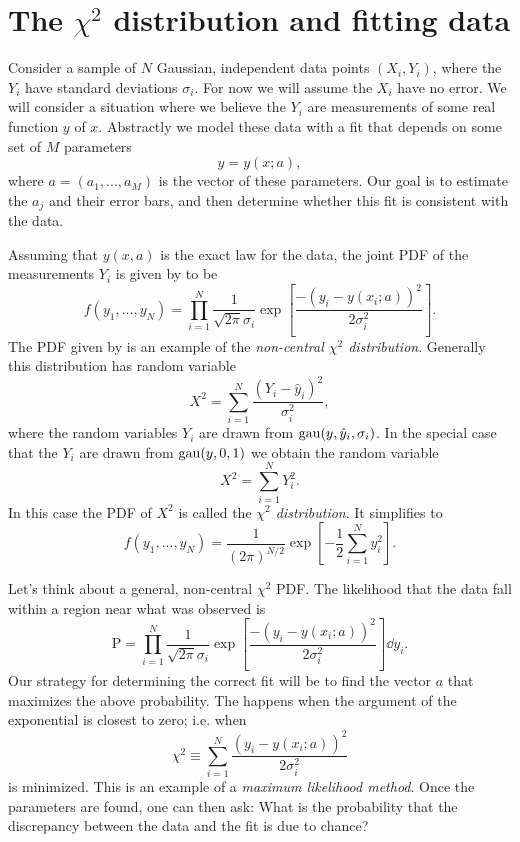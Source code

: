 \section{The $\chi^2$ distribution and fitting data}
Consider a sample of $N$ Gaussian, independent data points $(X_i,Y_i)$,
where the $Y_i$ have standard deviations $\sigma_i$. For now we will
assume the $X_i$ have no error. We will consider a situation where
we believe the $Y_i$ are measurements of some real function $y$ of $x$.
Abstractly we model these data with a fit that depends on some set
of $M$ parameters
\begin{equation}
  y=y(x;a),
\end{equation}
where $a=(a_1,...,a_M)$ is the vector of these parameters. Our goal
is to estimate the $a_j$ and their error bars, and then determine whether
this fit is consistent with the data.

Assuming that $y(x,a)$ is the exact law for the data, the joint PDF
of the measurements $Y_i$ is given by  to be
\begin{equation}\label{eq:chi2NC}
  f(y_1,...,y_N)=\prod_{i=1}^N\frac{1}{\sqrt{2\pi}\sigma_i}
      \exp\left[\frac{-(y_i-y(x_i;a))^2}{2\sigma_i^2}\right].
\end{equation}
The PDF given by  is an example of the 
{\it non-central $\chi^2$ distribution}. Generally this distribution
has random variable
\begin{equation}
  X^2=\sum_{i=1}^N\frac{(Y_i-\hat{y}_i)^2}{\sigma_i^2},
\end{equation}
where the random variables $Y_i$ are drawn from $\operatorname{gau}(y,\hat{y}_i,\sigma_i)$. 
In the special case that the $Y_i$ are drawn from $\operatorname{gau}(y,0,1)$ we
obtain the random variable
\begin{equation}
  X^2=\sum\limits_{i=1}^NY_i^2.
\end{equation}
In this case the PDF of $X^2$ is called the {\it $\chi^2$ distribution}. 
 It simplifies to 
\begin{equation}\label{eq:chi2dist}
  f(y_1,...,y_N)=\frac{1}{(2\pi)^{N/2}}
      \exp\left[-\frac{1}{2}\sum_{i=1}^Ny_i^2\right].
\end{equation}

Let's think about a general, non-central $\chi^2$ PDF. The likelihood that the
data fall within a region near what was observed is 
\begin{equation}
  \text{P}=\prod_{i=1}^N\frac{1}{\sqrt{2\pi}\sigma_i}
      \exp\left[\frac{-(y_i-y(x_i;a))^2}{2\sigma_i^2}\right]\dd{y_i}.
\end{equation}
Our strategy for determining the correct fit will be to find the vector $a$
that maximizes the above probability. The happens when the argument
of the exponential is closest to zero; i.e. when
\begin{equation}
  \chi^2\equiv\sum_{i=1}^N\frac{(y_i-y(x_i;a))^2}{2\sigma_i^2}
\end{equation}
is minimized. This is an example of a {\it maximum likelihood method}.
Once the parameters are found, one can then ask: What is the probability
that the discrepancy between the data and the fit is due to chance? 


